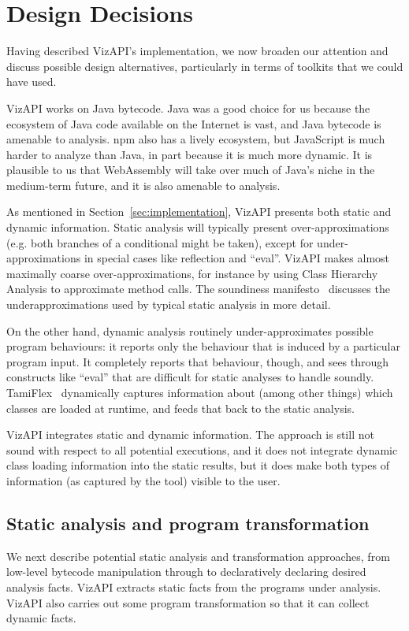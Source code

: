 \section{Design Decisions}
\label{sec:design-decisions}

Having described VizAPI's implementation, we now broaden our attention
and discuss possible design alternatives, particularly in terms of toolkits
that we could have used.

VizAPI works on Java bytecode. Java was a good choice for us
because the ecosystem of Java code available on the
Internet is vast, and Java bytecode is amenable to analysis. 
npm also has a lively ecosystem, but JavaScript is much harder to
analyze than Java, in part because it is much more dynamic. It is plausible
to us that WebAssembly will take over much of Java's niche in the medium-term
future, and it is also amenable to analysis.

As mentioned in Section~\ref{sec:implementation}, VizAPI presents both
static and dynamic information. Static analysis will typically present
over-approximations (e.g. both branches of a conditional might be
taken), except for under-approximations in special cases like
reflection and ``eval''. VizAPI makes almost maximally coarse
over-approximations, for instance by using Class Hierarchy Analysis to
approximate method calls. The soundiness
manifesto~\cite{livshits15:_in_defen_sound} discusses the
underapproximations used by typical static analysis in more detail.

On the other hand, dynamic analysis routinely under-approximates possible
program behaviours: it reports only the behaviour that is induced by
a particular program input. It completely reports that behaviour, though,
and sees through constructs like ``eval'' that are difficult for static analyses to
handle soundly. TamiFlex~\cite{bodden11:_tamin_reflec} dynamically captures
information about (among other things) which classes are loaded at runtime,
and feeds that back to the static analysis.

VizAPI integrates static and dynamic information. The approach is
still not sound with respect to all potential executions, and it does
not integrate dynamic class loading information into the static
results, but it does make both types of information (as 
captured by the tool) visible to the user.

\subsection{Static analysis and program transformation}
We next describe potential static analysis and transformation
approaches, from low-level bytecode manipulation through to
declaratively declaring desired analysis facts. VizAPI extracts static
facts from the programs under analysis. VizAPI also carries out some
program transformation so that it can collect dynamic facts.

